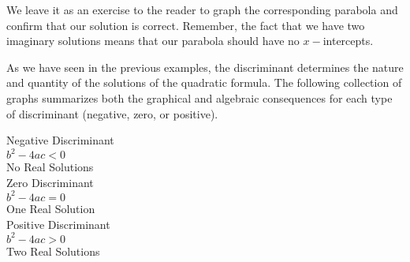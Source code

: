 \documentclass[12pt]{book}
\theoremstyle{definition}
\begin{document}
We leave it as an exercise to the reader to graph the corresponding parabola and confirm that our solution is correct.  Remember, the fact that we have two imaginary solutions means that our parabola should have no $x-$intercepts.\par
As we have seen in the previous examples, the discriminant determines the nature and quantity of the solutions of the quadratic formula.  The following collection of graphs summarizes both the graphical and algebraic consequences for each type of discriminant (negative, zero, or positive).
\begin{center}
\end{center}

\begin{center}
\begin{multicols}{3}
Negative Discriminant\\
$b^2-4ac<0$\\
No Real Solutions\\
Zero Discriminant\\
$b^2-4ac=0$\\
One Real Solution\\
Positive Discriminant\\
$b^2-4ac>0$\\
Two Real Solutions\\
\end{multicols}
\end{center}
\end{document}
